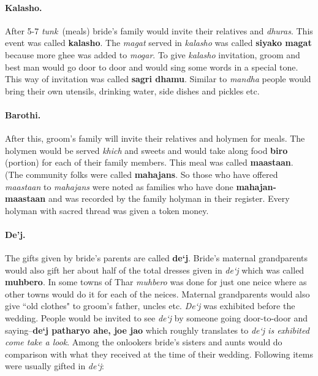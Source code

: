 \paragraph{Kalasho.} After 5-7 \textit{tunk}~(meals) bride's family would
invite their relatives and \textit{dhuras}. This event was called
\textbf{kalasho}. The \textit{magat} served in \textit{kalasho} was called
\textbf{siyako magat} because more ghee was added to \textit{mogar}. To give
\textit{kalasho} invitation, groom and best man would go door to door and would
sing some words in a special tone. This way of invitation was called
\textbf{sagri dhamu}. Similar to \textit{mandha} people would bring their own
utensils, drinking water, side dishes and pickles etc.

\paragraph{Barothi.} After this, groom's family will invite their relatives and
holymen for meals. The holymen would be served \textit{khich} and sweets and
would take along food \textbf{biro} (portion) for each of their family members.
This meal was called \textbf{maastaan}. (The community folks were called
\textbf{mahajans}. So those who have offered \textit{maastaan} to
\textit{mahajans} were noted as families who have done
\textbf{mahajan-maastaan} and was recorded by the family holyman in
their register. Every holyman with sacred thread was given a token
money.

\paragraph{De'j.} The gifts given by bride's parents are called \textbf{de`j}.
Bride's maternal grandparents would also gift her about half of the total
dresses given in \textit{de`j} which was called \textbf{muhbero}. In some towns
of Thar \textit{muhbero} was done for just one neice where as other towns would
do it for each of the neices. Maternal grandparents would also give ``old
clothes" to groom's father, uncles etc. \textit{De`j} was exhibited before the
wedding. People would be invited to see \textit{de`j} by someone going
door-to-door and saying--\textbf{de`j patharyo ahe, joe jao} which roughly
translates to \textit{de`j is exhibited come take a look}. Among the onlookers
bride's sisters and aunts would do comparison with what they received at the
time of their wedding. Following items were usually gifted in \textit{de`j}:

